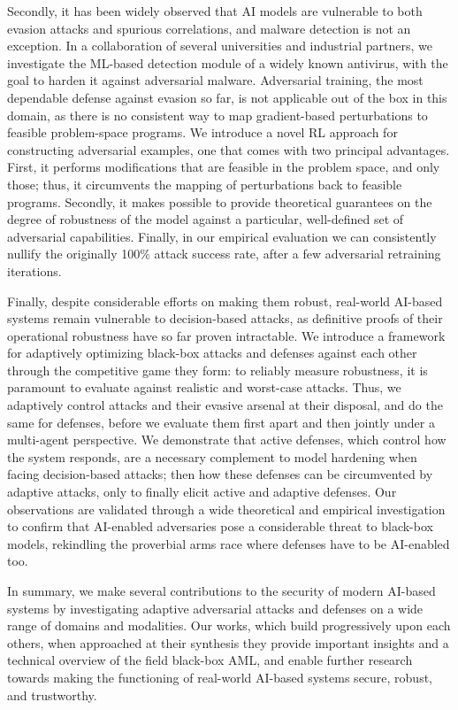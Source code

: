 Secondly, it has been widely observed that \gls{AI} models are vulnerable to both evasion attacks and spurious correlations, and malware detection is not an exception.
In a collaboration of several universities and industrial partners, we investigate the \gls{ML}-based detection module of a widely known antivirus, with the goal to harden it against adversarial malware.
Adversarial training, the most dependable defense against evasion so far, is not applicable out of the box in this domain, as there is no consistent way to map gradient-based perturbations to feasible problem-space programs.
We introduce a novel \gls{RL} approach for constructing adversarial examples, one that comes with two principal advantages.
First, it performs modifications that are feasible in the problem space, and only those; thus, it circumvents the mapping of perturbations back to feasible programs.
Secondly, it makes possible to provide theoretical guarantees on the degree of robustness of the model against a particular, well-defined set of adversarial capabilities.
Finally, in our empirical evaluation we can consistently nullify the originally 100\% attack success rate, after a few adversarial retraining iterations.

Finally, despite considerable efforts on making them robust, real-world AI-based systems remain vulnerable to decision-based attacks, as definitive proofs of their operational robustness have so far proven intractable.
We introduce a framework for adaptively optimizing black-box attacks and defenses against each other through the competitive game they form: to reliably measure robustness, it is paramount to evaluate against realistic and worst-case attacks.
Thus, we adaptively control attacks and their evasive arsenal at their disposal, and do the same for defenses, before we evaluate them first apart and then jointly under a multi-agent perspective.
We demonstrate that active defenses, which control how the system responds, are a necessary complement to model hardening when facing decision-based attacks; then how these defenses can be circumvented by adaptive attacks, only to finally elicit active and adaptive defenses.
Our observations are validated through a wide theoretical and empirical investigation to confirm that AI-enabled adversaries pose a considerable threat to black-box models, rekindling the proverbial arms race where defenses have to be AI-enabled too.

In summary, we make several contributions to the security of modern AI-based systems by investigating adaptive adversarial attacks and defenses on a wide range of domains and modalities.
Our works, which build progressively upon each others, when approached at their synthesis they provide important insights and a technical overview of the field black-box \gls{AML}, and enable further research towards making the functioning of real-world \gls{AI}-based systems secure, robust, and trustworthy.

\cleardoublepage

